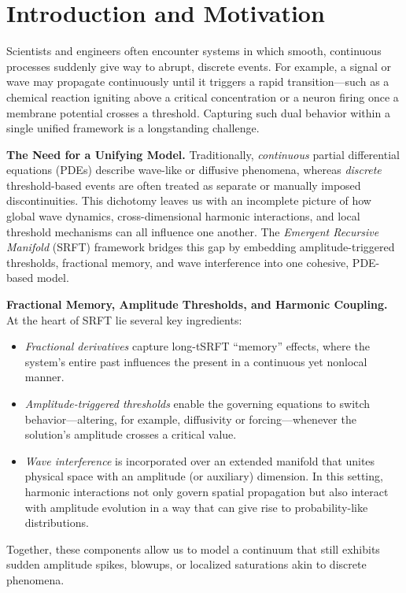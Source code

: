 \documentclass[12pt]{article}
\begin{document}
\section{Introduction and Motivation}
\label{sec:intro_monograph}

Scientists and engineers often encounter systems in which smooth, continuous processes suddenly give way to abrupt, discrete events. For example, a signal or wave may propagate continuously until it triggers a rapid transition—such as a chemical reaction igniting above a critical concentration or a neuron firing once a membrane potential crosses a threshold. Capturing such dual behavior within a single unified framework is a longstanding challenge.

\medskip

\noindent
\textbf{The Need for a Unifying Model.}  
Traditionally, \emph{continuous} partial differential equations (PDEs) describe wave-like or diffusive phenomena, whereas \emph{discrete} threshold-based events are often treated as separate or manually imposed discontinuities. This dichotomy leaves us with an incomplete picture of how global wave dynamics, cross-dimensional harmonic interactions, and local threshold mechanisms can all influence one another. The \emph{Emergent Recursive Manifold} (SRFT) framework bridges this gap by embedding amplitude-triggered thresholds, fractional memory, and wave interference into one cohesive, PDE-based model.

\medskip

\noindent
\textbf{Fractional Memory, Amplitude Thresholds, and Harmonic Coupling.}  
At the heart of SRFT lie several key ingredients:
\begin{itemize}
    \item \emph{Fractional derivatives} capture long-tSRFT “memory” effects, where the system’s entire past influences the present in a continuous yet nonlocal manner.
    \item \emph{Amplitude-triggered thresholds} enable the governing equations to switch behavior—altering, for example, diffusivity or forcing—whenever the solution’s amplitude crosses a critical value.
    \item \emph{Wave interference} is incorporated over an extended manifold that unites physical space with an amplitude (or auxiliary) dimension. In this setting, harmonic interactions not only govern spatial propagation but also interact with amplitude evolution in a way that can give rise to probability-like distributions.
\end{itemize}
Together, these components allow us to model a continuum that still exhibits sudden amplitude spikes, blowups, or localized saturations akin to discrete phenomena.
\end{document}
